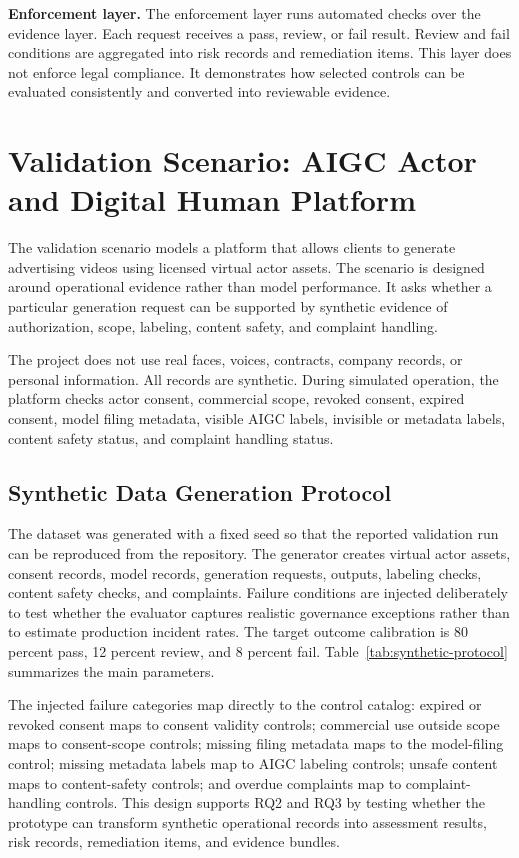 \documentclass[10pt,journal]{IEEEtran}
\begin{document}
\textbf{Enforcement layer.} The enforcement layer runs automated checks over the evidence layer. Each request receives a pass, review, or fail result. Review and fail conditions are aggregated into risk records and remediation items. This layer does not enforce legal compliance. It demonstrates how selected controls can be evaluated consistently and converted into reviewable evidence.
\FloatBarrier

\section{Validation Scenario: AIGC Actor and Digital Human Platform}

The validation scenario models a platform that allows clients to generate advertising videos using licensed virtual actor assets. The scenario is designed around operational evidence rather than model performance. It asks whether a particular generation request can be supported by synthetic evidence of authorization, scope, labeling, content safety, and complaint handling.

The project does not use real faces, voices, contracts, company records, or personal information. All records are synthetic. During simulated operation, the platform checks actor consent, commercial scope, revoked consent, expired consent, model filing metadata, visible AIGC labels, invisible or metadata labels, content safety status, and complaint handling status.

\subsection{Synthetic Data Generation Protocol}

The dataset was generated with a fixed seed so that the reported validation run can be reproduced from the repository. The generator creates virtual actor assets, consent records, model records, generation requests, outputs, labeling checks, content safety checks, and complaints. Failure conditions are injected deliberately to test whether the evaluator captures realistic governance exceptions rather than to estimate production incident rates. The target outcome calibration is 80 percent pass, 12 percent review, and 8 percent fail. Table~\ref{tab:synthetic-protocol} summarizes the main parameters.



The injected failure categories map directly to the control catalog: expired or revoked consent maps to consent validity controls; commercial use outside scope maps to consent-scope controls; missing filing metadata maps to the model-filing control; missing metadata labels map to AIGC labeling controls; unsafe content maps to content-safety controls; and overdue complaints map to complaint-handling controls. This design supports RQ2 and RQ3 by testing whether the prototype can transform synthetic operational records into assessment results, risk records, remediation items, and evidence bundles.
\end{document}
